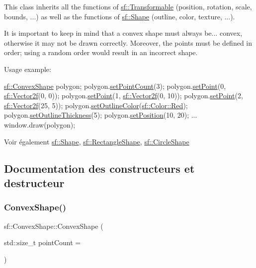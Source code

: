 This class inherits all the functions of \hyperlink{classsf_1_1Transformable}{sf\+::\+Transformable} (position, rotation, scale, bounds, ...) as well as the functions of \hyperlink{classsf_1_1Shape}{sf\+::\+Shape} (outline, color, texture, ...).

It is important to keep in mind that a convex shape must always be... convex, otherwise it may not be drawn correctly. Moreover, the points must be defined in order; using a random order would result in an incorrect shape.

Usage example\+: 
\begin{DoxyCode}
\hyperlink{classsf_1_1ConvexShape}{sf::ConvexShape} polygon;
polygon.\hyperlink{classsf_1_1ConvexShape_a56e6e79ade6dd651cc1a0e39cb68deae}{setPointCount}(3);
polygon.\hyperlink{classsf_1_1ConvexShape_a5929e0ab0ba5ca1f102b40c234a8e92d}{setPoint}(0, \hyperlink{classsf_1_1Vector2}{sf::Vector2f}(0, 0));
polygon.\hyperlink{classsf_1_1ConvexShape_a5929e0ab0ba5ca1f102b40c234a8e92d}{setPoint}(1, \hyperlink{classsf_1_1Vector2}{sf::Vector2f}(0, 10));
polygon.\hyperlink{classsf_1_1ConvexShape_a5929e0ab0ba5ca1f102b40c234a8e92d}{setPoint}(2, \hyperlink{classsf_1_1Vector2}{sf::Vector2f}(25, 5));
polygon.\hyperlink{classsf_1_1Shape_a5978f41ee349ac3c52942996dcb184f7}{setOutlineColor}(\hyperlink{classsf_1_1Color_a127dbf55db9c07d0fa8f4bfcbb97594a}{sf::Color::Red});
polygon.\hyperlink{classsf_1_1Shape_a5ad336ad74fc1f567fce3b7e44cf87dc}{setOutlineThickness}(5);
polygon.\hyperlink{classsf_1_1Transformable_a4dbfb1a7c80688b0b4c477d706550208}{setPosition}(10, 20);
...
window.draw(polygon);
\end{DoxyCode}


\begin{DoxySeeAlso}{Voir également}
\hyperlink{classsf_1_1Shape}{sf\+::\+Shape}, \hyperlink{classsf_1_1RectangleShape}{sf\+::\+Rectangle\+Shape}, \hyperlink{classsf_1_1CircleShape}{sf\+::\+Circle\+Shape} 
\end{DoxySeeAlso}


\subsection{Documentation des constructeurs et destructeur}
\mbox{\label{classsf_1_1ConvexShape_af9981b8909569b381b3fccf32fc69856}} 
\subsubsection{\texorpdfstring{Convex\+Shape()}{ConvexShape()}}
{\footnotesize\ttfamily sf\+::\+Convex\+Shape\+::\+Convex\+Shape (\begin{DoxyParamCaption}\item[{std\+::size\+\_\+t}]{point\+Count = {} }\end{DoxyParamCaption})\hspace{0.3cm}{\ttfamily [explicit]}}



